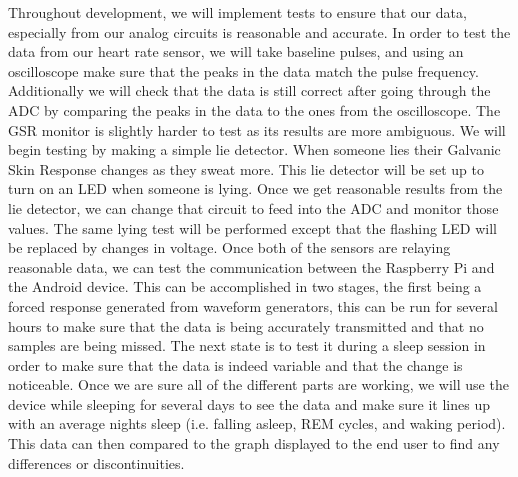 \documentclass[finalProposal.tex]{subfiles}
\begin{document}
Throughout development, we will implement tests to ensure that our data, especially from our analog circuits is reasonable and accurate. In order to test the data from our heart rate sensor, we will take baseline pulses, and using an oscilloscope make sure that the peaks in the data match the pulse frequency. Additionally we will check that the data is still correct after going through the ADC by comparing the peaks in the data to the ones from the oscilloscope. The GSR monitor is slightly harder to test as its results are more ambiguous. We will begin testing by making a simple lie detector. When someone lies their Galvanic Skin Response changes as they sweat more. This lie detector will be set up to turn on an LED when someone is lying. Once we get reasonable results from the lie detector, we can change that circuit to feed into the ADC and monitor those values. The same lying test will be performed except that the flashing LED will be replaced by changes in voltage. Once both of the sensors are relaying reasonable data, we can test the communication between the Raspberry Pi and the Android device. This can be accomplished in two stages, the first being a forced response generated from waveform generators, this can be run for several hours to make sure that the data is being accurately transmitted and that no samples are being missed. The next state is to test it during a sleep session in order to make sure that the data is indeed variable and that the change is noticeable. Once we are sure all of the different parts are working, we will use the device while sleeping for several days to see the data and make sure it lines up with an average nights sleep (i.e. falling asleep, REM cycles, and waking period). This data can then compared to the graph displayed to the end user to find any differences or discontinuities. 

 
\end{document}
